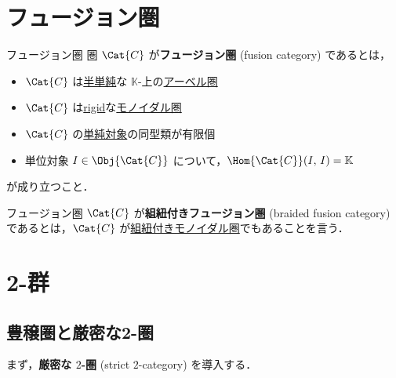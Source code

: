 \documentclass[TQFT_main]{subfiles}
\begin{document}
\section{フュージョン圏}

\begin{mydef}[label=def:fusion-cat]{フュージョン圏}
    圏 $\Cat{C}$ が\textbf{フュージョン圏} (fusion category) であるとは，
    \begin{itemize}
        \item $\Cat{C}$ は\hyperref[def:semisimple-cat]{半単純}な $\mathbb{K}$-上の\hyperref[def:additive-cat]{アーベル圏}
        \item $\Cat{C}$ は\hyperref[redef:rigid]{rigid}な\hyperref[redef:monoidal-category]{モノイダル圏}
        \item $\Cat{C}$ の\hyperref[def:semisimple-cat]{単純対象}の同型類が有限個
        \item 単位対象 $I \in \Obj{\Cat{C}}$ について，$\Hom{\Cat{C}}(I,\, I) = \mathbb{K}$
    \end{itemize}
    が成り立つこと．

    \tcblower

    フュージョン圏 $\Cat{C}$ が\textbf{組紐付きフュージョン圏} (braided fusion category) であるとは，$\Cat{C}$ が\hyperref[redef:braided-monoidal]{組紐付きモノイダル圏}でもあることを言う．
\end{mydef}

\section{2-群}

\subsection{豊穣圏と厳密な2-圏}

まず，\textbf{厳密な $2$-圏} (strict $2$-category) を導入する．
\end{document}
